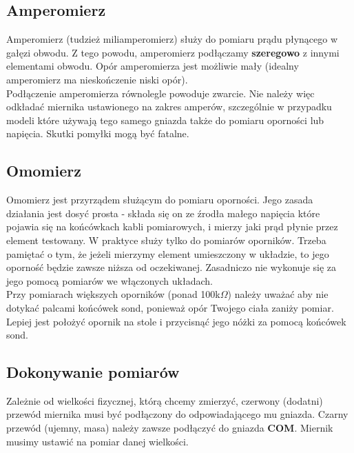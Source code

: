 \documentclass{pdfBooklets}
\begin{document}
\subsection{Amperomierz}
Amperomierz (tudzież miliamperomierz) służy do pomiaru prądu płynącego w gałęzi obwodu. Z tego powodu, amperomierz podłączamy
\textbf{szeregowo} z innymi elementami obwodu. Opór amperomierza jest możliwie mały (idealny amperomierz ma nieskończenie niski opór).
\\

Podłączenie amperomierza równolegle powoduje zwarcie. Nie należy więc odkładać miernika ustawionego na zakres amperów, szczególnie
w przypadku modeli które używają tego samego gniazda także do pomiaru oporności lub napięcia. Skutki pomyłki mogą być fatalne.

\subsection{Omomierz}
Omomierz jest przyrządem służącym do pomiaru oporności. Jego zasada działania jest dosyć prosta - składa się on ze źrodła małego napięcia
które pojawia się na końcówkach kabli pomiarowych, i mierzy jaki prąd płynie przez element testowany. W praktyce służy
tylko do pomiarów oporników. Trzeba pamiętać o tym, że jeżeli mierzymy element umieszczony w układzie, to jego oporność będzie zawsze
niższa od oczekiwanej. Zasadniczo nie wykonuje się za jego pomocą pomiarów we włączonych układach.
\\
Przy pomiarach większych oporników (ponad 100k$\Omega$) należy uważać aby nie dotykać palcami końcówek sond, ponieważ opór Twojego ciała
zaniży pomiar. Lepiej jest położyć opornik na stole i przycisnąć jego nóżki za pomocą końcówek sond.


% 

\subsection{Dokonywanie pomiarów}

Zależnie od wielkości fizycznej, którą chcemy zmierzyć, czerwony (dodatni) przewód miernika musi być podłączony do odpowiadającego
mu gniazda. Czarny przewód (ujemny, masa) należy zawsze podłączyć do gniazda \textbf{COM}. Miernik musimy ustawić na pomiar danej
wielkości.
\\
\end{document}
